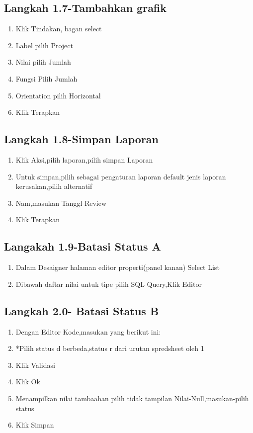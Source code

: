 \documentclass{article}
\begin{document}
\subsection{Langkah 1.7-Tambahkan grafik}
      \begin{enumerate}
          \item Klik Tindakan, bagan select 
          \item Label pilih Project 
           \item Nilai pilih Jumlah 
           \item Fungsi Pilih Jumlah
          \item Orientation pilih Horizontal
          \item  Klik Terapkan
      \end{enumerate}
\subsection{Langkah 1.8-Simpan Laporan}
\begin{enumerate}
    \item Klik Aksi,pilih laporan,pilih simpan Laporan
    \item Untuk simpan,pilih sebagai pengaturan laporan default jenis laporan kerusakan,pilih alternatif
    \item Nam,masukan Tanggl Review
    \item Klik Terapkan
\end{enumerate}
\subsection{Langakah 1.9-Batasi Status A}
    \begin{enumerate}
        \item Dalam Desaigner halaman editor properti(panel kanan) Select List
        \item Dibawah daftar nilai untuk tipe pilih SQL Query,Klik Editor
    
    \end{enumerate}
\subsection{Langkah 2.0- Batasi Status B}
    \begin{enumerate}
        \item Dengan Editor Kode,masukan yang berikut ini:
        \item *Pilih status d berbeda,status r dari urutan spredsheet oleh 1
        \item Klik Validasi
        \item Klik Ok
        \item Menampilkan nilai tambaahan pilih tidak tampilan Nilai-Null,masukan-pilih status
        \item Klik Simpan
        
    \end{enumerate}
\end{document}
